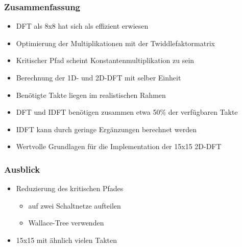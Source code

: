\begin{frame}\frametitle{Zusammenfassung}
 \begin{itemize}
  \item DFT als 8x8 hat sich als effizient erwiesen
  \item Optimierung der Multiplikationen mit der Twiddlefaktormatrix
  \item Kritischer Pfad scheint Konstantenmultiplikation zu sein
  \item Berechnung der 1D- und 2D-DFT mit selber Einheit
  \item Benötigte Takte liegen im realistischen Rahmen
  \item DFT und IDFT benötigen zusammen etwa 50\% der verfügbaren Takte
  \item IDFT kann durch geringe Ergänzungen berechnet werden
  \item Wertvolle Grundlagen für die Implementation der 15x15 2D-DFT
 \end{itemize}

\end{frame}


\begin{frame}\frametitle{Ausblick}
\begin{itemize}
 \item Reduzierung des kritischen Pfades
 \begin{itemize}
  \item auf zwei Schaltnetze aufteilen
  \item Wallace-Tree verwenden
 \end{itemize}
 \item 15x15 mit ähnlich vielen Takten
\end{itemize}

 
\end{frame}




